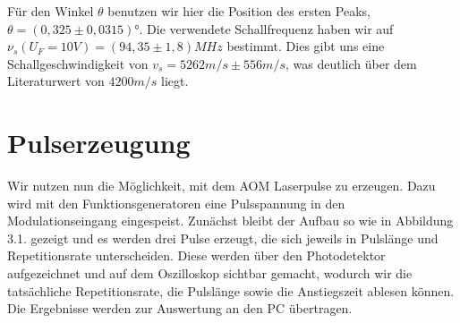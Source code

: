 \documentclass[bigchapter,colorback,accentcolor=tud4b,linedtoc,11pt]{tudreport}
\begin{document}
Für den Winkel $\theta$ benutzen wir hier die Position des ersten Peaks, $\theta = (0,325 \pm 0,0315)$°. Die verwendete Schallfrequenz haben wir auf $\nu_s\left( U_F= 10V \right) = \left( 94,35 \pm 1,8 \right)MHz$ bestimmt. Dies gibt uns eine Schallgeschwindigkeit von $v_s = 5262m/s \pm 556m/s$, was deutlich über dem Literaturwert von $4200m/s$ liegt.

\section{Pulserzeugung}

Wir nutzen nun die Möglichkeit, mit dem AOM Laserpulse zu erzeugen. Dazu wird mit den Funktionsgeneratoren eine Pulsspannung in den Modulationseingang eingespeist. Zunächst bleibt der Aufbau so wie in Abbildung 3.1. gezeigt und es werden drei Pulse erzeugt, die sich jeweils in Pulslänge und Repetitionsrate unterscheiden. Diese werden über den Photodetektor aufgezeichnet und auf dem Oszilloskop sichtbar gemacht, wodurch wir die tatsächliche Repetitionsrate, die Pulslänge sowie die Anstiegszeit ablesen können. Die Ergebnisse werden zur Auswertung an den PC übertragen.
\end{document}
